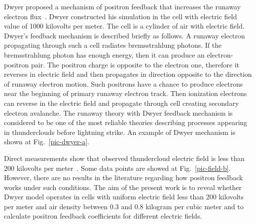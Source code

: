 \documentclass[utf8]{webofc}
\begin{document}
    Dwyer proposed a mechanism of positron feedback that increases the runaway electron flux~\cite{dwyer2003fundamental}. Dwyer constructed his simulation in the cell with electric field value of 1000 kilovolts per meter. The cell is a cylinder of air with electric field. Dwyer’s feedback mechanism is described briefly as follows. A runaway electron propagating through such a cell radiates bremsstrahlung photons. If the bremsstrahlung photon has enough energy, then it can produce an electron-positron pair. The positron charge is opposite to the electron one, therefore it reverses in electric field and then propagates in direction opposite to the direction of runaway electron motion. Such positrons have a chance to produce electrons near the beginning of primary runaway electron track. Then ionization electrons can reverse in the electric field and propagate through cell creating secondary electron avalanche. The runaway theory with Dwyer feedback mechanism is considered to be one of the most reliable theories describing processes appearing in thunderclouds before lightning strike. An example of Dwyer mechanism is shown at Fig.~\ref{pic-dwyer-a}.
    
    Direct measurements show that observed thundercloud electric field is less than 200 kilovolts per  meter~\cite{mazin1989clouds, marshall1995electric}. Some data points are showed at Fig.~\ref{pic-field-b}. However, there are no results in the literature regarding how positron feedback works under such conditions. The aim of the present work is to reveal whether Dwyer model operates in cells with uniform electric field less than 200 kilovolts per meter and air density between 0.3 and 0.8 kilogram per cubic meter and to calculate positron feedback coefficients for different electric fields. %
\end{document}
